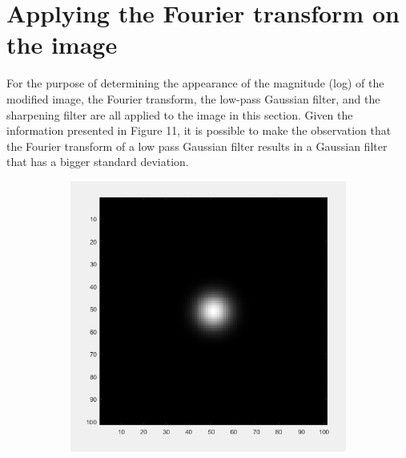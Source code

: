 \section{Applying the Fourier transform on the image}\label{P4}

For the purpose of determining the appearance of the magnitude (log) of the modified image, the Fourier transform, the low-pass Gaussian filter, and the sharpening filter are all applied to the image in this section. Given the information presented in Figure 11, it is possible to make the observation that the Fourier transform of a low pass Gaussian filter results in a Gaussian filter that has a bigger standard deviation. 

\begin{figure}[h]
    \centering
    \begin{subfigure}{0.4\textwidth}
        \includegraphics[width=\textwidth]{Resources/F11-a.png}
        \caption{}
        \label{fig:first}
    \end{subfigure}
    \hfill
    \begin{subfigure}{0.4\textwidth}

\end{subfigure}
\end{figure}

